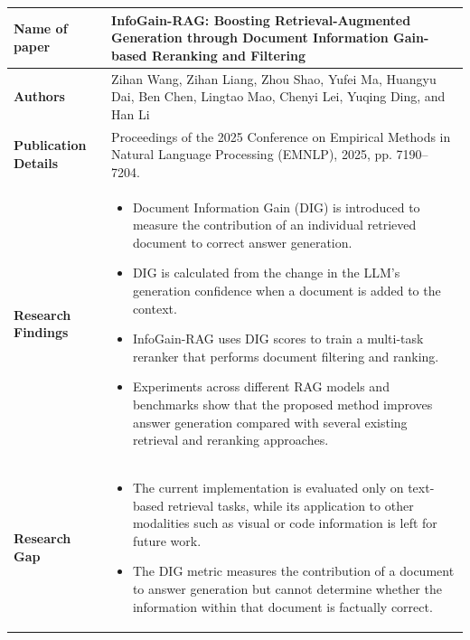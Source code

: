 \documentclass[12pt,a4paper]{report}
\begin{document}
\begin{longtable}{|p{1.25in}|p{5.15in}|}

\hline

\textbf{Name of paper} &
\textbf{InfoGain-RAG: Boosting Retrieval-Augmented Generation through Document Information Gain-based Reranking and Filtering}
\\ \hline

\textbf{Authors} &
Zihan Wang, Zihan Liang, Zhou Shao, Yufei Ma, Huangyu Dai, Ben Chen, Lingtao Mao, Chenyi Lei, Yuqing Ding, and Han Li
\\ \hline

\textbf{Publication Details} &
Proceedings of the 2025 Conference on Empirical Methods in Natural Language Processing (EMNLP), 2025, pp. 7190--7204.
\\ \hline

\textbf{Research Findings} &
\begin{itemize}[
    leftmargin=0.18in,
    itemsep=0.05in,
    topsep=0pt,
    parsep=0pt
]
    \item Document Information Gain (DIG) is introduced to measure the contribution of an individual retrieved document to correct answer generation.

    \item DIG is calculated from the change in the LLM's generation confidence when a document is added to the context.

    \item InfoGain-RAG uses DIG scores to train a multi-task reranker that performs document filtering and ranking.

    \item Experiments across different RAG models and benchmarks show that the proposed method improves answer generation compared with several existing retrieval and reranking approaches.
\end{itemize}
\\ \hline

\textbf{Research Gap} &
\begin{itemize}[
    leftmargin=0.18in,
    itemsep=0.05in,
    topsep=0pt,
    parsep=0pt
]
    \item The current implementation is evaluated only on text-based retrieval tasks, while its application to other modalities such as visual or code information is left for future work.

    \item The DIG metric measures the contribution of a document to answer generation but cannot determine whether the information within that document is factually correct.


\end{itemize}
\end{longtable}
\end{document}
